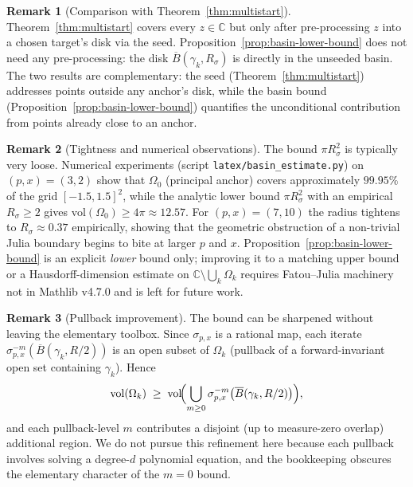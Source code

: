 \documentclass[11pt,a4paper]{article}
\theoremstyle{definition}
\newtheorem{remark}{Remark}[section]
\begin{document}
\begin{remark}[Comparison with Theorem~\ref{thm:multistart}]
Theorem~\ref{thm:multistart} covers every $z \in \mathbb{C}$ but only after pre-processing $z$ into a chosen target's disk via the seed. Proposition~\ref{prop:basin-lower-bound} does not need any pre-processing: the disk $\overline{B}(\gamma_k, R_\sigma)$ is directly in the unseeded basin. The two results are complementary: the seed (Theorem~\ref{thm:multistart}) addresses points outside any anchor's disk, while the basin bound (Proposition~\ref{prop:basin-lower-bound}) quantifies the unconditional contribution from points already close to an anchor.
\end{remark}

\begin{remark}[Tightness and numerical observations]
The bound $\pi R_\sigma^2$ is typically very loose. Numerical experiments (script \texttt{latex/basin\_estimate.py}) on $(p, x) = (3, 2)$ show that $\Omega_0$ (principal anchor) covers approximately $99.95\%$ of the grid $[-1.5, 1.5]^2$, while the analytic lower bound $\pi R_\sigma^2$ with an empirical $R_\sigma \geq 2$ gives $\mathrm{vol}(\Omega_0) \geq 4\pi \approx 12.57$. For $(p, x) = (7, 10)$ the radius tightens to $R_\sigma \approx 0.37$ empirically, showing that the geometric obstruction of a non-trivial Julia boundary begins to bite at larger $p$ and $x$. Proposition~\ref{prop:basin-lower-bound} is an explicit \emph{lower} bound only; improving it to a matching upper bound or a Hausdorff-dimension estimate on $\mathbb{C} \setminus \bigcup_k \Omega_k$ requires Fatou--Julia machinery not in Mathlib v4.7.0 and is left for future work.
\end{remark}

\begin{remark}[Pullback improvement]
The bound can be sharpened without leaving the elementary toolbox. Since $\sigma_{p,x}$ is a rational map, each iterate $\sigma_{p,x}^{-m}(\overline{B}(\gamma_k, R/2))$ is an open subset of $\Omega_k$ (pullback of a forward-invariant open set containing $\gamma_k$). Hence
\[
  \mathrm{vol}(\Omega_k)
  \;\geq\; \mathrm{vol}\!\Bigl(\bigcup_{m \geq 0} \sigma_{p,x}^{-m}\bigl(\overline{B}(\gamma_k, R/2)\bigr)\Bigr),
\]
and each pullback-level $m$ contributes a disjoint (up to measure-zero overlap) additional region. We do not pursue this refinement here because each pullback involves solving a degree-$d$ polynomial equation, and the bookkeeping obscures the elementary character of the $m = 0$ bound.
\end{remark}
\end{document}
